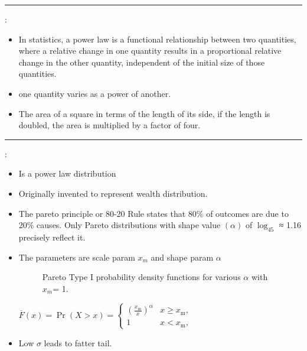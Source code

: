 \documentclass[	DIV=calc,%
paper=a4,%
fontsize=11pt,%
twocolumn]{scrartcl} %
\newcommand{\hformbar}[1]{\vspace{5pt}\hrule\vspace{10pt}} %
\newcommand{\formdesc}[1]{\noindent\textbf{#1}}
\begin{document}
\hformbar

\formdesc{Power law}:
	\begin{itemize}
		\item In statistics, a power law is a functional relationship between two quantities, where a relative change in one quantity results in a proportional relative change in the other quantity, independent of the initial size of those quantities.
		\item one quantity varies as a power of another.
		\item The area of a square in terms of the length of its side, if the length is doubled, the area is multiplied by a factor of four.
	\end{itemize}


\hformbar

\formdesc{Pareto distribution}:
	\begin{itemize}
		\item Is a power law distribution
		\item Originally invented to represent wealth distribution. 
		\item The pareto principle or 80-20 Rule states that 80\% of outcomes are due to 20\% causes. Only Pareto distributions with shape value $(\alpha)$ of $\log_45$ ≈ 1.16 precisely reflect it. 
		\item The parameters are scale param $x_m$ and shape param $\alpha$
			\begin{figure}[ht!]
			\centering
			\graphicspath{ {images/math/} }
			\caption{Pareto Type I probability density functions for various $\alpha$ with $x_m$= 1. }
			
		\end{figure}
	
	\begin{math}
		{\displaystyle {\overline {F}}(x)=\Pr(X>x)={\begin{cases}\left({\frac {x_{\mathrm {m} }}{x}}\right)^{\alpha }&x\geq x_{\mathrm {m} },\\1&x<x_{\mathrm {m} },\end{cases}}}
	\end{math}

	\item Low $\sigma$ leads to fatter tail.
	
	\end{itemize}
\end{document}
